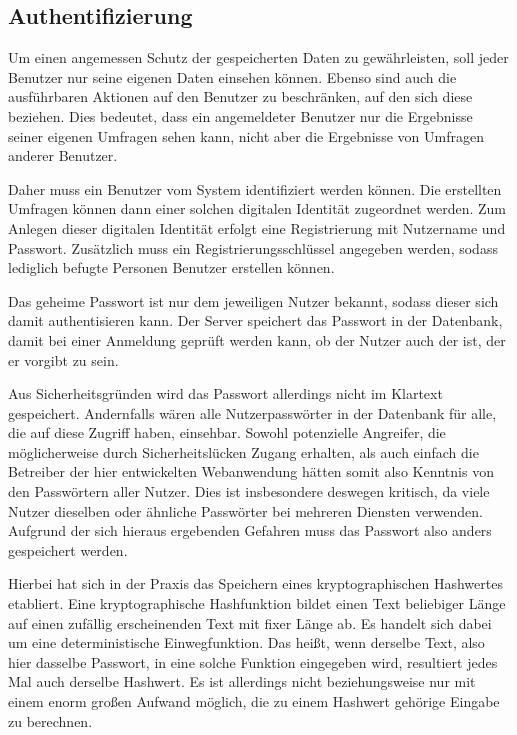 \subsection{Authentifizierung}
\label{sec:authentifizierung}
\authorsection{\authorNL}

Um einen angemessen Schutz der gespeicherten Daten zu gewährleisten, soll jeder Benutzer nur seine eigenen Daten einsehen können.
Ebenso sind auch die ausführbaren Aktionen auf den Benutzer zu beschränken, auf den sich diese beziehen.
Dies bedeutet, dass ein angemeldeter Benutzer nur die Ergebnisse seiner eigenen Umfragen sehen kann, nicht aber die Ergebnisse von Umfragen anderer Benutzer.

Daher muss ein Benutzer vom System identifiziert werden können.
Die erstellten Umfragen können dann einer solchen digitalen Identität zugeordnet werden.
Zum Anlegen dieser digitalen Identität erfolgt eine Registrierung mit Nutzername und Passwort.
Zusätzlich muss ein Registrierungsschlüssel angegeben werden, sodass lediglich befugte Personen Benutzer erstellen können.

Das geheime Passwort ist nur dem jeweiligen Nutzer bekannt, sodass dieser sich damit authentisieren kann.
Der Server speichert das Passwort in der Datenbank, damit bei einer Anmeldung geprüft werden kann, ob der Nutzer auch der ist, der er vorgibt zu sein.

Aus Sicherheitsgründen wird das Passwort allerdings nicht im Klartext gespeichert.
Andernfalls wären alle Nutzerpasswörter in der Datenbank für alle, die auf diese Zugriff haben, einsehbar.
Sowohl potenzielle Angreifer, die möglicherweise durch Sicherheitslücken Zugang erhalten, als auch einfach die Betreiber der hier entwickelten Webanwendung hätten somit also Kenntnis von den Passwörtern aller Nutzer.
Dies ist insbesondere deswegen kritisch, da viele Nutzer dieselben oder ähnliche Passwörter bei mehreren Diensten verwenden.
Aufgrund der sich hieraus ergebenden Gefahren muss das Passwort also anders gespeichert werden.

Hierbei hat sich in der Praxis das Speichern eines kryptographischen Hashwertes etabliert.
Eine kryptographische Hashfunktion bildet einen Text beliebiger Länge auf einen zufällig erscheinenden Text mit fixer Länge ab.
Es handelt sich dabei um eine deterministische Einwegfunktion.
Das heißt, wenn derselbe Text, also hier dasselbe Passwort, in eine solche Funktion eingegeben wird, resultiert jedes Mal auch derselbe Hashwert.
Es ist allerdings nicht beziehungsweise nur mit einem enorm großen Aufwand möglich, die zu einem Hashwert gehörige Eingabe zu berechnen.

